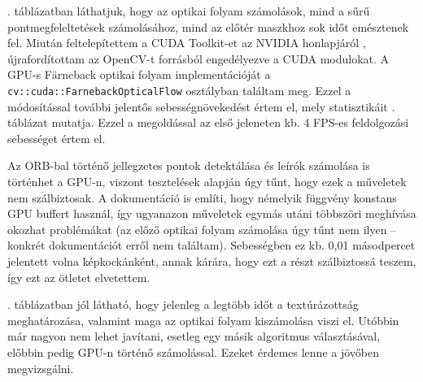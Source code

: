 . táblázatban láthatjuk, hogy az optikai folyam számolások, mind a sűrű pontmegfeleltetések számolásához, mind az előtér maszkhoz sok időt emésztenek fel. Miután feltelepítettem a CUDA Toolkit-et az NVIDIA honlapjáról \cite{cuda-nvidia}, újrafordítottam az OpenCV-t forrásból engedélyezve a CUDA modulokat. A GPU-s Färneback optikai folyam implementációját a \texttt{cv::cuda::FarnebackOpticalFlow} osztályban találtam meg. Ezzel a módosítással további jelentős sebességnövekedést értem el, mely statisztikáit . táblázat mutatja. Ezzel a megoldással az első jeleneten kb. 4 FPS-es feldolgozási sebességet értem el.

Az ORB-bal történő jellegzetes pontok detektálása és leírók számolása is történhet a GPU-n, viszont tesztelések alapján úgy tűnt, hogy ezek a műveletek nem szálbiztosak. A dokumentáció \cite{cuda-stream} is említi, hogy némelyik függvény konstans GPU buffert használ, így ugyanazon műveletek egymás utáni többszöri meghívása okozhat problémákat (az előző optikai folyam számolása úgy tűnt nem ilyen -- konkrét dokumentációt erről nem találtam). Sebességben ez kb. 0,01 másodpercet jelentett volna képkockánként, annak kárára, hogy ezt a részt szálbiztossá teszem, így ezt az ötletet elvetettem.

. táblázatban jól látható, hogy jelenleg a legtöbb időt a textúrázottság meghatározása, valamint maga az optikai folyam kiszámolása viszi el. Utóbbin már nagyon nem lehet javítani, esetleg egy másik algoritmus választásával, előbbin pedig GPU-n történő számolással. Ezeket érdemes lenne a jövőben megvizsgálni.

